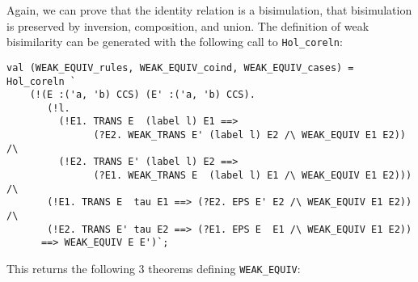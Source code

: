 Again, we can prove that the identity
relation is a bisimulation, that bisimulation is preserved by inversion,
 composition, and union. 
The definition of weak bisimilarity can be
 generated with the following call to
\texttt{Hol_coreln}:
\begin{lstlisting}
val (WEAK_EQUIV_rules, WEAK_EQUIV_coind, WEAK_EQUIV_cases) = Hol_coreln `
    (!(E :('a, 'b) CCS) (E' :('a, 'b) CCS).
       (!l.
         (!E1. TRANS E  (label l) E1 ==>
               (?E2. WEAK_TRANS E' (label l) E2 /\ WEAK_EQUIV E1 E2)) /\
         (!E2. TRANS E' (label l) E2 ==>
               (?E1. WEAK_TRANS E  (label l) E1 /\ WEAK_EQUIV E1 E2))) /\
       (!E1. TRANS E  tau E1 ==> (?E2. EPS E' E2 /\ WEAK_EQUIV E1 E2)) /\
       (!E2. TRANS E' tau E2 ==> (?E1. EPS E  E1 /\ WEAK_EQUIV E1 E2))
      ==> WEAK_EQUIV E E')`;
\end{lstlisting}
This returns the following 3 theorems defining \texttt{WEAK_EQUIV}:
